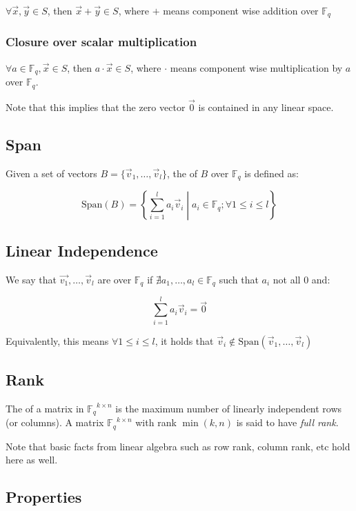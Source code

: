 \documentclass{idc_msc}
\newcommand{\Fq}{{\mathbb{F}_q}}
\begin{document}
\(\forall \vec{x}, \vec{y} \in S\), then \(\vec{x} + \vec{y} \in S\), where \(+\) means component wise addition over \(\Fq\)

\subsubsection{Closure over scalar multiplication}

\(\forall a \in \Fq, \vec{x} \in S\), then \(a \cdot \vec{x} \in S\), where \(\cdot\) means component wise multiplication by \(a\) over \(\Fq\).

Note that this implies that the zero vector \(\vec{0}\) is contained in any linear space.

\subsection{Span}

Given a set of vectors \(B=\{\vec{v}_1,\ldots,\vec{v}_l\}\), the  of \(B\) over \(\Fq\) is defined as:

\[ \text{Span}(B) = \left\{ \sum_{i=1}^l a_i \vec{v}_i \middle| a_i \in \Fq;\forall 1 \le i \le l  \right\}\]

\subsection{Linear Independence}

We say that \(\vec{v_1}, \ldots, \vec{v}_l\) are  over \(\Fq\) if \(\nexists a_1,\ldots,a_l \in \Fq\) such that \(a_i\) not all 0 and:

\[\sum_{i=1}^l a_i \vec{v}_i = \vec{0}\]

Equivalently, this means \(\forall 1 \le i \le l\), it holds that \(\vec{v}_i \notin \text{Span}(\vec{v}_1,\ldots,\vec{v}_l)\)

\subsection{Rank}

The  of a matrix in \(\Fq^{k \times n}\) is the maximum number of linearly independent rows (or columns).
A matrix \(\Fq^{k \times n}\) with rank \(\min(k,n)\) is said to have \emph{full rank}.

Note that basic facts from linear algebra such as row rank, column rank, etc hold here as well.

\subsection{Properties}
\end{document}
